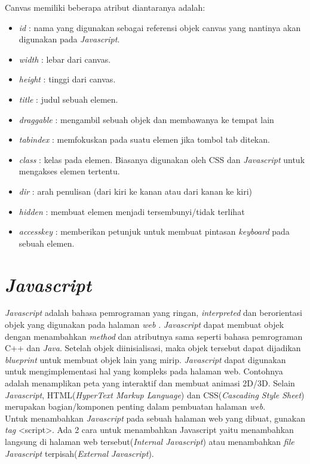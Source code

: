 Canvas memiliki beberapa atribut diantaranya adalah: 
\begin{itemize}
	\item \textit{id} : nama yang digunakan sebagai referensi objek canvas yang nantinya akan digunakan pada \textit{Javascript}.
	\item \textit{width} : lebar dari canvas.
	\item \textit{height} : tinggi dari canvas.
	\item \textit{title} : judul sebuah elemen.
	\item \textit{draggable} : mengambil sebuah objek dan membawanya ke tempat lain
	\item \textit{tabindex} : memfokuskan pada suatu elemen jika tombol tab ditekan.
	\item \textit{class} : kelas pada elemen. Biasanya digunakan oleh CSS dan \textit{Javascript} untuk mengakses elemen tertentu.
	\item \textit{dir} : arah penulisan (dari kiri ke kanan atau dari kanan ke kiri)
	\item \textit{hidden} : membuat elemen menjadi tersembunyi/tidak terlihat
	\item \textit{accesskey} : memberikan petunjuk untuk membuat pintasan \textit{keyboard} pada sebuah elemen.
\end{itemize}


\section{\textit{Javascript}}
\label{sec:Javascript}
\textit{Javascript} adalah bahasa pemrograman yang ringan, \textit{interpreted} dan berorientasi objek yang digunakan pada halaman \textit{web} \cite{MDN:05:Web}. \textit{Javascript} dapat membuat objek dengan menambahkan \textit{method} dan atributnya sama seperti bahasa pemrograman C++ dan \textit{Java}. Setelah objek diinisialisasi, maka objek tersebut dapat dijadikan \textit{blueprint} untuk membuat objek lain yang mirip. \textit{Javascript} dapat digunakan untuk mengimplementasi hal yang kompleks pada halaman web. Contohnya adalah menamplikan peta yang interaktif dan membuat animasi 2D/3D. Selain \textit{Javascript}, HTML(\textit{HyperText Markup Language}) dan CSS(\textit{Cascading Style Sheet}) merupakan bagian/komponen penting dalam pembuatan halaman \textit{web}.\\

Untuk menambahkan \textit{Javascript} pada sebuah halaman web yang dibuat, gunakan \textit{tag} <script>. Ada 2 cara untuk menambahkan Javascript yaitu menambahkan langsung di halaman web tersebut(\textit{Internal Javascript}) atau menambahkan \textit{file Javascript} terpisah(\textit{External Javascript}).

